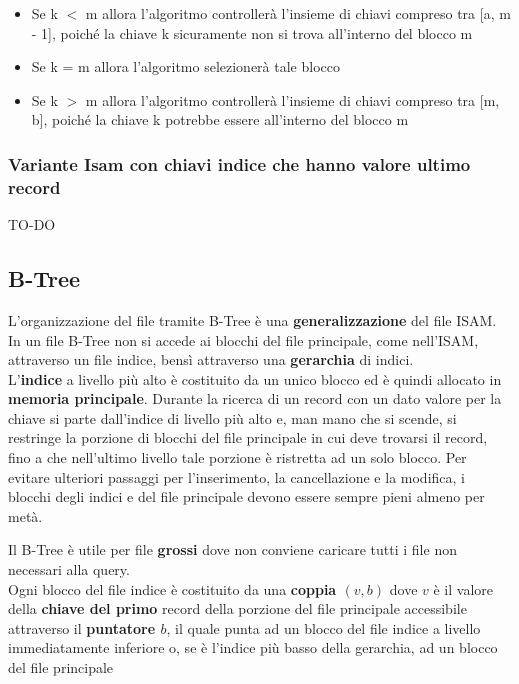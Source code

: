 \documentclass{article}
\begin{document}
\begin{itemize}
  \item Se k $<$ m allora l'algoritmo controllerà l'insieme di chiavi compreso tra [a, m - 1], poiché la chiave k sicuramente non si trova all'interno del blocco m
  \item Se k = m allora l'algoritmo selezionerà tale blocco
  \item Se k $>$ m allora l'algoritmo controllerà l'insieme di chiavi compreso tra [m, b], poiché la chiave k potrebbe essere all'interno del blocco m
\end{itemize}

\subsubsection{Variante Isam con chiavi indice che hanno valore ultimo record}
TO-DO

\pagebreak
\subsection{B-Tree}
L'organizzazione del file tramite B-Tree è una \textbf{generalizzazione} del file ISAM. In un file B-Tree non si accede ai blocchi del file principale, come nell'ISAM, attraverso un file indice, bensì attraverso una \textbf{gerarchia} di indici. \\

L'\textbf{indice} a livello più alto è costituito da un unico blocco ed è quindi allocato in \textbf{memoria principale}. Durante la ricerca di un record con un dato valore per la chiave si parte dall'indice di livello più alto e, man mano che si scende, si restringe la porzione di blocchi del file principale in cui deve trovarsi il record, fino a che nell'ultimo livello tale porzione è ristretta ad un solo blocco. Per evitare ulteriori passaggi per l'inserimento, la cancellazione e la modifica, i blocchi degli indici e del file principale devono essere sempre pieni almeno per metà.\par
Il B-Tree è utile per file \textbf{grossi} dove non conviene caricare tutti i file non necessari alla query.\\

Ogni blocco del file indice è costituito da una \textbf{coppia $(v,b)$} dove $v$ è il valore della \textbf{chiave del primo} record della porzione del file principale accessibile attraverso il \textbf{puntatore $b$}, il quale punta ad un blocco del file indice a livello immediatamente inferiore o, se è l'indice più basso della gerarchia, ad un blocco del file principale
\end{document}
